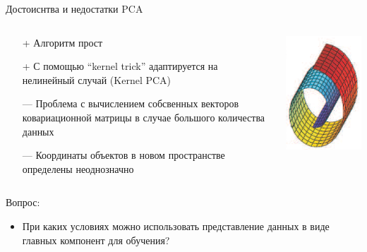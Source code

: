 \documentclass[10pt]{beamer}
\begin{document}
\begin{frame}{Достоиснтва и недостатки PCA}
\begin{columns}[C]
    \begin{column}{.5\textwidth}
        \begin{itemize}
        \item[+] Алгоритм прост
        \item[+] С помощью ``kernel trick'' адаптируется на нелинейный случай (Kernel
                    PCA)
        \item[---] Проблема с вычислением собсвенных векторов ковариационной матрицы
                    в случае большого количества данных
        \item[---] Координаты объектов в новом пространстве определены неоднозначно
        \end{itemize}
    \end{column}
    \begin{column}{.5\textwidth}
        \includegraphics[scale=0.5]{images/surface.png}
    \end{column}
\end{columns}

\begin{block}{Вопрос:}
\begin{itemize}
    \item При каких условиях можно использовать представление данных в виде
        главных компонент для обучения?
\end{itemize}
\end{block}
\end{frame}
\end{document}
